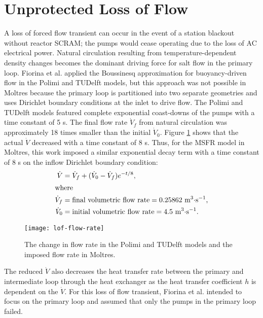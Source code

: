 \section{Unprotected Loss of Flow}

A loss of forced flow transient can occur in the event of a station blackout
without reactor SCRAM; the pumps would cease operating due to the loss of AC
electrical
power. Natural circulation resulting from temperature-dependent density
changes becomes the dominant driving force for salt flow in the primary loop.
Fiorina et al. \cite{fiorina_modelling_2014} applied the Boussinesq
approximation for buoyancy-driven flow in the Polimi and TUDelft models, but
this approach was not possible in Moltres because the primary loop is
partitioned into two separate geometries and uses Dirichlet boundary
conditions at the inlet to drive flow. The Polimi and TUDelft
models featured complete exponential coast-downs of the pumps with a time
constant of 5 s. The final flow rate $\dot{V}_f$ from natural circulation
was approximately 18 times smaller than the initial $\dot{V}_0$. Figure
\ref{fig:flowrate} shows that the actual $\dot{V}$ decreased with a time
constant of 8 s. Thus, for the \gls{MSFR} model in Moltres, this work imposed
a similar exponential decay term with a time constant of 8 s on the inflow
Dirichlet boundary condition:
%
\begin{align}
    \dot{V} &= \dot{V}_f + (\dot{V}_0-\dot{V}_f) e^{-t/8},
    \label{eq:flowrate} \\
    \intertext{where}
    \dot{V}_f &= \text{final volumetric flow rate} = 0.25862
    \text{ m$^3\cdot$s$^{-1}$,} \nonumber \\
    \dot{V}_0 &= \text{initial volumetric flow rate} = 4.5
    \text{ m$^3\cdot$s$^{-1}$.} \nonumber
\end{align}
%
\begin{figure}[htbp!]
    \centering
    \texttt{[image: lof-flow-rate]}
    \caption{The change in flow rate in the Polimi and TUDelft models and the
    imposed flow rate in Moltres.}
    \label{fig:flowrate}
\end{figure}
%
The reduced $\dot{V}$ also decreases the heat transfer rate between the
primary and intermediate loop through the heat exchanger as the heat transfer
coefficient $h$ is dependent on the $\dot{V}$. For this loss of flow
transient, Fiorina et al. \cite{fiorina_modelling_2014} intended to focus
on the primary loop and assumed that only the pumps in the primary loop
failed.

